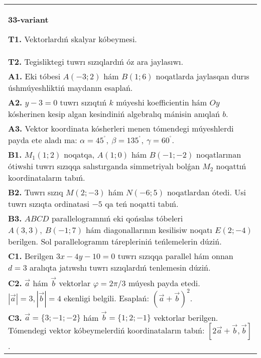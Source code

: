 \documentclass{article}
\begin{document}
\begin{tabular}{m{17cm}}
\textbf{33-variant}

\textbf{T1.} 
Vektorlardıń skalyar kóbeymesi.
 \\
\textbf{T2.} 
Tegisliktegi tuwrı sızıqlardıń óz ara jaylasıwı.
 \\
\textbf{A1.} 
Eki tóbesi $A (-3; 2) $ hám $B (1; 6) $ noqatlarda
jaylasqan durıs úshmúyeshliktiń maydanın esaplań.
 \\
\textbf{A2.} 
$y-3=0$ tuwrı sızıqtıń $k$ múyeshi
koefficientin hám $Oy$ kósherinen kesip algan kesindiniń algebralıq
mánisin anıqlań $b$.
 \\
\textbf{A3.} 
Vektor koordinata kósherleri menen tómendegi múyeshlerdi payda ete aladı ma:
$\alpha = 45^{{^\circ}},\ \beta = 135^{{^\circ}},\ \gamma = 60^{{^\circ}}$.
 \\
\textbf{B1.} 
\(M_{1} (1;2) \) noqatqa, \(A (1;0) \) hám \(B (-1;-2) \)
noqatlarınan ótiwshi tuwrı sızıqqa salıstırganda simmetriyalı bolǵan \(M_{2}\) noqattıń koordinataların tabıń.
 \\
\textbf{B2.} 
Tuwrı sızıq \(M (2;-3) \) hám \(N (-6;5) \) noqatlardan ótedi.
Usi tuwrı sızıqta ordinatasi $-5$ qa teń noqatti tabıń.
 \\
\textbf{B3.} 
$ABCD$ parallelogramnıń eki qońsılas tóbeleri
\(A (3,3),\ B (-1;7) \) hám diagonallarının kesilisiw noqatı
\(E (2;-4) \) berilgen. Sol parallelogramm tárepleriniń teńlemelerin
dúziń.
 \\
\textbf{C1.} 
Berilgen \(3x-4y-10=0\) tuwrı sızıqqa parallel hám onnan
$d=3$ aralıqta jatıwshı tuwrı sızıqlardıń tenlemesin dúziń.
 \\
\textbf{C2.} 
$\vec{a}$ hám $\vec{b}$ vektorlar $\varphi = 2\pi/3$ múyesh payda etedi. $|\vec{a}| = 3,|\vec{b}| = 4$ ekenligi belgili. Esaplań:
$ (\vec{a} + \vec{b}) ^{2}$.
 \\
\textbf{C3.} 
$\vec{a} = \{ 3; - 1; - 2\}$ hám $\vec{b} = \{ 1;2; - 1\}$ vektorlar berilgen. Tómendegi vektor kóbeymelerdiń koordinataların tabıń:
$\left\lbrack 2\vec{a} + \vec{b},\vec{b} \right\rbrack$.
 \\

\end{tabular}
\vspace{1cm}
\end{document}
